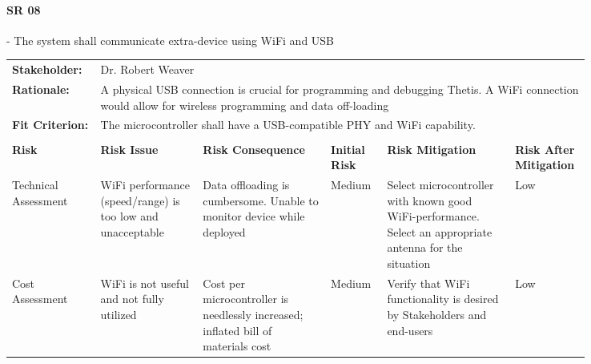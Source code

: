 \begin{landscape}


\paragraph*{SR 08} - The system shall communicate extra-device using WiFi and USB 

{\fontsize{8pt}{8pt}\selectfont
\begin{longtable}{| p{0.12\linewidth} | p{0.16\linewidth} |  p{0.20\linewidth} | p{0.08\linewidth} | p{0.20\linewidth} | p{0.08\linewidth} |}
	\hline \endlastfoot
	
	\hline
	\rowcolor[gray]{0.8}
	\multicolumn{6}{|c|}{ } \\
	\hline
	\textbf{Stakeholder:} & \multicolumn{5}{|l|}{Dr. Robert Weaver} \\
	\hline
	\textbf{Rationale:} & \multicolumn{5}{|p{0.8\linewidth}|}{A physical USB connection is crucial for programming and debugging Thetis. A WiFi connection would allow for wireless programming and data off-loading} \\
	\hline
	\textbf{Fit Criterion:} & \multicolumn{5}{|p{0.8\linewidth}|}{The microcontroller shall have a USB-compatible PHY and WiFi capability.} \\
	\hline
	\rowcolor[gray]{0.8}
	\multicolumn{6}{|c|}{ } \\
	\hline
	\textbf{Risk} & \textbf{Risk Issue} & \textbf{Risk Consequence} & \textbf{Initial Risk} & \textbf{Risk Mitigation} & \textbf{Risk \newline After \newline Mitigation} \\
	\hline
	Technical \newline Assessment & WiFi performance (speed/range) is too low and unacceptable & Data offloading is cumbersome. \newline Unable to monitor device while deployed & \cellcolor{yellow} Medium & Select microcontroller with known good WiFi-performance. \newline Select an appropriate antenna for the situation & \cellcolor{green} Low \\
	\hline
	Cost \newline Assessment & WiFi is not useful and not fully utilized & Cost per microcontroller is needlessly increased; inflated bill of materials cost & \cellcolor{yellow} Medium & Verify that WiFi functionality is desired by Stakeholders and end-users & \cellcolor{green} Low \\

\end{longtable}}
\end{landscape}
